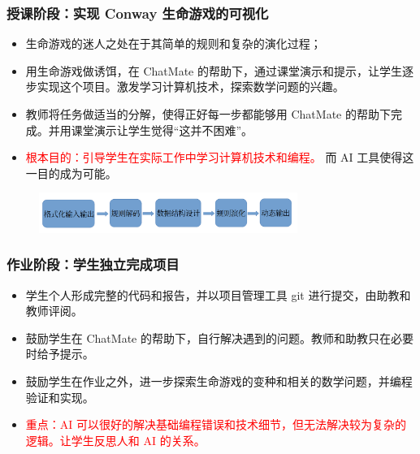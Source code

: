 \documentclass{beamer}
\begin{document}
\begin{frame}
    \frametitle{授课阶段：实现 Conway 生命游戏的可视化}
    \begin{itemize}
        \item 生命游戏的迷人之处在于其简单的规则和复杂的演化过程；
        \item 用生命游戏做诱饵，在 ChatMate 的帮助下，通过课堂演示和提示，让学生逐步实现这个项目。激发学习计算机技术，探索数学问题的兴趣。
        \item 教师将任务做适当的分解，使得正好每一步都能够用 ChatMate 的帮助下完成。并用课堂演示让学生觉得``这并不困难''。
        \item \textcolor{red}{根本目的：引导学生在实际工作中学习计算机技术和编程。} 而 AI 工具使得这一目的成为可能。
    \end{itemize}
    \begin{figure}
        \includegraphics[width=0.75\textwidth]{images/steps.png}
    \end{figure}
\end{frame}

\begin{frame}
    \frametitle{作业阶段：学生独立完成项目}
    \begin{itemize}
        \item<1-> 学生个人形成完整的代码和报告，并以项目管理工具 git 进行提交，由助教和教师评阅。
        \item<1-> 鼓励学生在 ChatMate 的帮助下，自行解决遇到的问题。教师和助教只在必要时给予提示。
        \item<1-> 鼓励学生在作业之外，进一步探索生命游戏的变种和相关的数学问题，并编程验证和实现。
        \item<2-> \textcolor{red}{重点：AI 可以很好的解决基础编程错误和技术细节，但无法解决较为复杂的逻辑。让学生反思人和 AI 的关系。}
    \end{itemize}    
\end{frame}
\end{document}
